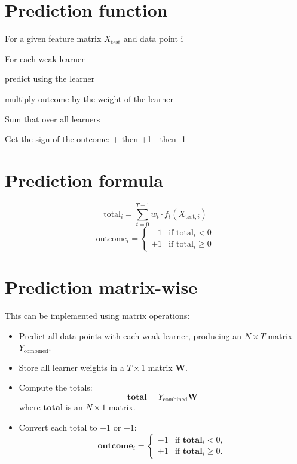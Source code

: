 \documentclass[12pt, letterpaper]{article}
\begin{document}
\section{Prediction function}
For a given feature matrix \(X_{\text{test}}\) and data point i
{\par\medskip}
For each weak learner
{\par\medskip}
\hspace*{6pt}predict using the learner
{\par\medskip}
\hspace*{6pt}multiply outcome by the weight of the learner
{\par\medskip}
Sum that over all learners
{\par\medskip}
Get the sign of the outcome: + then +1 - then -1

\section{Prediction formula}
\[
\text{total}_i = \sum_{t=0}^{T-1} w_t \cdot f_t(X_{\text{test},i})
\]
\[
\text{outcome}_i = 
\begin{cases}
-1 & \text{if total}_i < 0\\
+1 & \text{if total}_i \geq 0
\end{cases}
\]

\section{Prediction matrix-wise}
This can be implemented using matrix operations:

\begin{itemize}
    \item Predict all data points with each weak learner, producing an
    \(N \times T\) matrix \(Y_{\text{combined}}\).
    \item Store all learner weights in a \(T \times 1\) matrix
    \(\mathbf{W}\).
    \item Compute the totals:
    \[
    \mathbf{total} =
    Y_{\text{combined}}\mathbf{W}
    \]
    where \(\mathbf{total}\) is an \(N \times 1\) matrix.
    \item Convert each total to \(-1\) or \(+1\):
    \[
    \mathbf{outcome}_i =
    \begin{cases}
        -1 & \text{if } \mathbf{total}_i < 0,\\
        +1 & \text{if } \mathbf{total}_i \geq 0.
    \end{cases}
    \]
\end{itemize}
\end{document}
